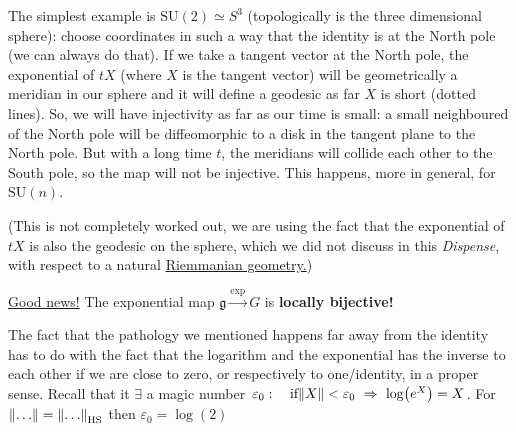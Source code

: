 \documentclass[../main.tex]{subfiles}
\begin{document}
\begin{example}
The simplest example is $\textrm{SU}(2)\simeq S^3$ (topologically is the three dimensional sphere): choose coordinates in such a way that the identity is at the North pole (we can always do that). If we take a tangent vector at the North pole, the exponential of $tX$ (where $X$ is the tangent vector) will be geometrically a meridian in our sphere and it will define a geodesic as far $X$ is short (dotted lines). So, we will have injectivity as far as our time is small: a small neighboured of the North pole will be diffeomorphic to a disk in the tangent plane to the North pole. But with a long time $t$, the meridians will collide each other to the South pole, so the map will not be injective. This happens, more in general, for $\textrm{SU}(n)$.

(This is not completely worked out, we are using the fact that the exponential of $tX$ is also the geodesic on the sphere, which we did not discuss in this \textit{Dispense}, with respect to a natural \href{https://en.wikipedia.org/wiki/Riemannian_geometry}{Riemmanian geometry.})
\end{example}
{\color{red}\underline{Good news!}} The exponential map $\mathfrak{g}\xrightarrow{\exp}G$ is \textbf{locally bijective!}

The fact that the pathology we mentioned happens far away from the identity has to do with the fact that the logarithm and the exponential has the inverse to each other if we are close to zero, or respectively to one/identity, in a proper sense. Recall that it $\exists$ a magic number $\varepsilon_0: \quad \text{if} \norm{X}<\varepsilon_0 \ \Rightarrow \ \log(e^X)=X$. For $\norm{\dots}=\norm{\dots}_{\textrm{HS}}$ then $\varepsilon_0=\log(2)$
\end{document}
